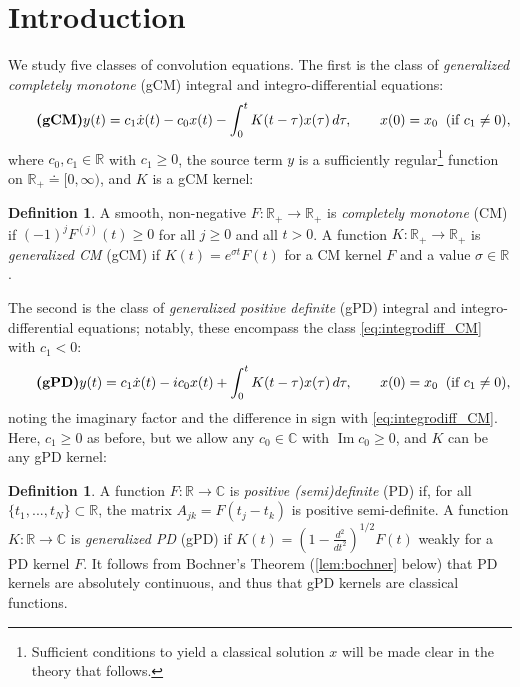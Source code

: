 \documentclass{cams-l} %
\newcommand{\CC}{\mathbb C}
\newcommand{\RR}{\mathbb R}
\newcommand{\op}{\operatorname}
\renewcommand{\Im}{\op{Im}}
\DeclareRobustCommand{\gobblefour}[5]{}
\newcommand*{\SkipTocEntry}{\addtocontents{toc}{\gobblefour}}
\theoremstyle{definition}
\newtheorem{definition}[theorem]{Definition}
\theoremstyle{remark}
\numberwithin{equation}{section}
\begin{document}
\let\oldnumberline\numberline
\renewcommand{\numberline}[1]{}
\SkipTocEntry
\listoffigures%
\let\numberline\oldnumberline



\davebegin
\section{Introduction}\label{sec:intro}
We study five classes of convolution equations. The first is the class of \emph{generalized completely monotone} (gCM) integral and integro-differential equations:
\begin{equation}\tag*{\textbf{(gCM)}}\label{eq:integrodiff_CM}
    y(t) = c_1\dot{x}(t) - c_0x(t) - \int_{0}^t K(t-\tau)x(\tau)\,d\tau,\qquad x(0) = x_0\;\;\text{(if }c_1\neq 0\text{)},
\end{equation}
where $c_0,c_1\in\RR$ with $c_1\geq 0$, the source term $y$ is a sufficiently regular\footnote{Sufficient conditions to yield a classical solution $x$ will be made clear in the theory that follows.} function on $\RR_+\doteq [0,\infty)$, and $K$ is a gCM kernel:
\begin{definition}\label{def:CMkernel}
    A smooth, non-negative $F:\RR_+\to\RR_+$ is \emph{completely monotone} (CM) if $(-1)^jF^{(j)}(t)\geq 0$ for all $j\geq 0$ and all $t>0$. A function $K:\RR_+\to\RR_+$ is \emph{generalized CM} (gCM) if $K(t) = e^{\sigma t}F(t)$ for a CM kernel $F$ and a value $\sigma\in\RR$.
\end{definition}

The second is the class of \emph{generalized positive definite} (gPD) integral and integro-differential equations; notably, these encompass the class \ref{eq:integrodiff_CM} with $c_1<0$:
\begin{equation}\tag*{\textbf{(gPD)}}\label{eq:integrodiff_PD}
	y(t) = c_1\dot{x}(t) -ic_0x(t) + \int_0^t K(t-\tau)x(\tau)\,d\tau,\qquad x(0) = x_0\;\;\text{(if }c_1\neq 0\text{)},
\end{equation}
noting the imaginary factor and the difference in sign with \ref{eq:integrodiff_CM}. Here, $c_1\geq 0$ as before, but we allow any $c_0\in\CC$ with $\Im c_0\geq 0$, and $K$ can be any gPD kernel:
\begin{definition}\label{def:PDkernel}
    A function $F:\RR\to\CC$ is \emph{positive (semi)definite} (PD) if, for all $\{t_1,...,t_N\}\subset\RR$, the matrix $A_{jk} = F(t_j - t_k)$ is positive semi-definite. A function $K:\RR\to\CC$ is \emph{generalized PD} (gPD) if $K(t) = (1 - \frac{d^2}{dt^2})^{1/2}F(t)$ weakly for a PD kernel $F$. It follows from Bochner's Theorem (\cref{lem:bochner} below) that PD kernels are absolutely continuous, and thus that gPD kernels are classical functions.
\end{definition}
\end{document}
